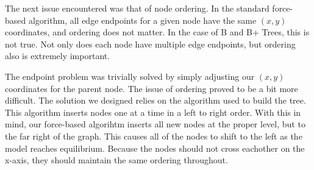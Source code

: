 The next issue encountered was that of node ordering. In the
standard force-based algorithm, all edge endpoints for a given node
have the same $(x,y)$ coordinates, and ordering does not matter. In
the case of B and B+ Trees, this is not true. Not only does each node
have multiple edge endpoints, but ordering also is extremely
important.

The endpoint problem was trivially solved by simply adjusting our
$(x,y)$ coordinates for the parent node. The issue of ordering proved
to be a bit more difficult. The solution we designed relies on the
algorithm used to build the tree. This algorithm inserts nodes one at
a time in a left to right order. With this in mind, our force-based
algorihtm inserts all new nodes at the proper level, but to the far
right of the graph. This causes all of the nodes to shift to the left
as the model reaches equilibrium. Because the nodes should not cross
eachother on the x-axis, they should maintain the same ordering throughout.

